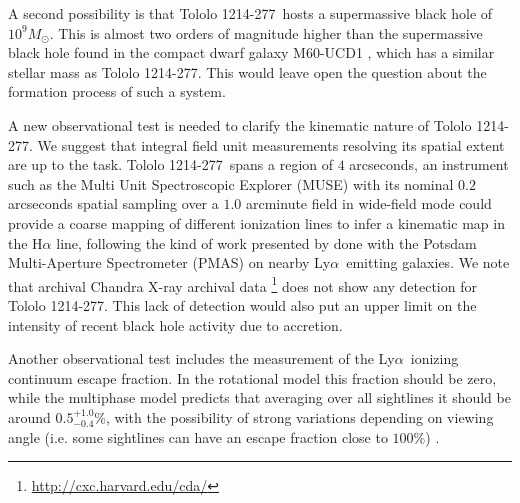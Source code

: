 \documentclass[a4,useAMS,usenatbib,usegraphicx]{mn2e}
\newcommand{\tol}{Tololo 1214-277}
\newcommand{\lya}{Ly$\alpha$}
\newcommand{\kms}{km s$^{-1}$}
\begin{document}
A second possibility is that \tol\ hosts a supermassive black hole of
$10^{9} M_{\odot}$. This is almost two orders of magnitude higher
than the supermassive black hole found in the compact dwarf galaxy
M60-UCD1 \citep{2014Natur.513..398S}, which has a similar stellar mass
as \tol. This would leave open the question about the formation
process of such a system.   


A new observational test is needed to clarify the kinematic nature of
\tol. 
We suggest that integral field unit measurements 
resolving its spatial extent are up to the task. 
\tol\ spans a region of $4$ arcseconds,
an instrument such as the Multi Unit Spectroscopic Explorer (MUSE)
\citep{2014Msngr.157...13B} with its
nominal $0.2$ arcseconds spatial sampling over a $1.0$ arcminute field
in wide-field mode could provide a coarse mapping of different
ionization lines to infer a kinematic map in the H$\alpha$ line,
following the kind of work presented by \citet{Herenz16} done with the Potsdam
Multi-Aperture Spectrometer (PMAS) \citet{PMAS} on nearby
\lya\ emitting galaxies.
We note that archival Chandra X-ray archival
data \footnote{\url{http://cxc.harvard.edu/cda/}} does not show any
detection for \tol.
This lack of detection would also put an upper limit on the intensity
of recent black hole activity due to accretion. 

Another observational test includes the measurement of the
\lya\ ionizing continuum escape fraction.
In the rotational model this fraction should be zero, while
the multiphase model predicts that averaging over all sightlines
it should be around $0.5^{+1.0}_{-0.4}$\%, with the possibility of strong
variations depending on viewing angle (i.e. some sightlines can have
an escape fraction close to $100\%$)\citep{Gronke2016} . 
\end{document}
